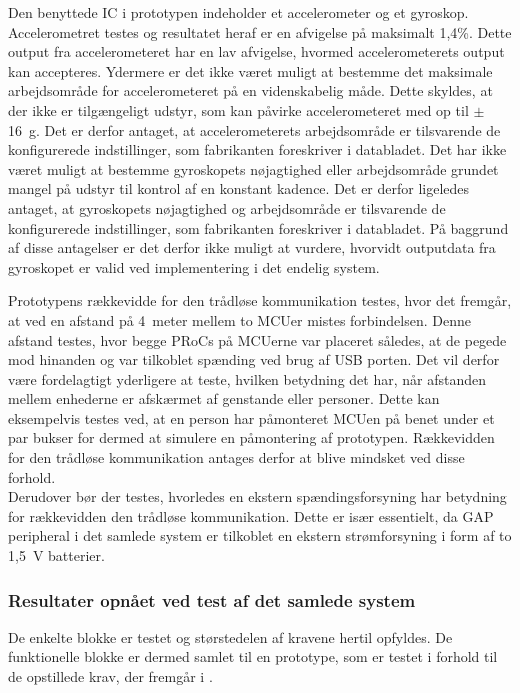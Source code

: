 Den benyttede IC i prototypen indeholder et accelerometer og et gyroskop. Accelerometret testes og resultatet heraf er en afvigelse på maksimalt 1,4\%. Dette output fra accelerometeret har en lav afvigelse, hvormed accelerometerets output kan accepteres. Ydermere er det ikke været muligt at bestemme det maksimale arbejdsområde for accelerometeret på en videnskabelig måde. Dette skyldes, at der ikke er tilgængeligt udstyr, som kan påvirke accelerometeret med op til $\pm$16~g. Det er derfor antaget, at accelerometerets arbejdsområde er tilsvarende de konfigurerede indstillinger, som fabrikanten foreskriver i databladet. Det har ikke været muligt at bestemme gyroskopets nøjagtighed eller arbejdsområde grundet mangel på udstyr til kontrol af en konstant kadence. Det er derfor ligeledes antaget, at gyroskopets nøjagtighed og arbejdsområde er tilsvarende de konfigurerede indstillinger, som fabrikanten foreskriver i databladet. På baggrund af disse antagelser er det derfor ikke muligt at vurdere, hvorvidt outputdata fra gyroskopet er valid ved implementering i det endelig system. 

Prototypens rækkevidde for den trådløse kommunikation testes, hvor det fremgår, at ved en afstand på 4~meter mellem to MCUer mistes forbindelsen. Denne afstand testes, hvor begge PRoCs på MCUerne var placeret således, at de pegede mod hinanden og var tilkoblet spænding ved brug af USB porten. Det vil derfor være fordelagtigt yderligere at teste, hvilken betydning det har, når afstanden mellem enhederne er afskærmet af genstande eller personer. Dette kan eksempelvis testes ved, at en person har påmonteret MCUen på benet under et par bukser for dermed at simulere en påmontering af prototypen. Rækkevidden for den trådløse kommunikation antages derfor at blive mindsket ved disse forhold. \\
Derudover bør der testes, hvorledes en ekstern spændingsforsyning har betydning for rækkevidden den trådløse kommunikation. Dette er især essentielt, da GAP peripheral i det samlede system er tilkoblet en ekstern strømforsyning i form af to 1,5~V batterier.

\subsubsection{Resultater opnået ved test af det samlede system}
De enkelte blokke er testet og størstedelen af kravene hertil opfyldes. De funktionelle blokke er dermed samlet til en prototype, som er testet i forhold til de opstillede krav, der fremgår i .

